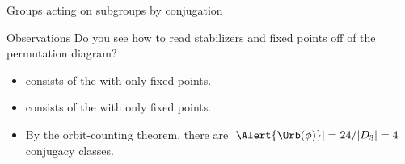 \documentclass[8pt, handout]{beamer}
\newcommand{\Pause}{}      %
\begin{document}
\begin{frame}{Groups acting on subgroups by conjugation}
  \begin{exampleblock}{Observations}
    Do you see how to read stabilizers and fixed points off of the
    permutation diagram? \Pause
    \begin{itemize}
    \item {} consists of the 
      with only fixed points. \Pause
    \item {} consists of the
       with only fixed points. \Pause
    \item By the orbit-counting theorem, there are
      $|\Alert{\Orb(\phi)}|=24/|D_3|=4$ conjugacy classes.
    \end{itemize}
  \end{exampleblock}
  
\end{frame}

\end{document}
